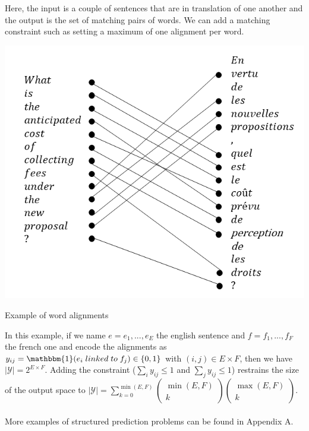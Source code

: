 \begin{example}
Here, the input is a couple of sentences that are in translation of one another
and the output is the set of matching pairs of words. We can add a matching
constraint such as setting a maximum of one alignment per word. 
\begin{center}
\includegraphics[scale=0.6]{img/lecture_1_word_alignment.png}

Example of word alignments
\end{center}
In this example, if we name $e = e_1, ..., e_E$ the english sentence and $f =
f_1, ..., f_F$ the french one and encode the alignments as $y_{ij} =
\mathbbm{1}(e_i \; linked \; to \; f_j) \in \{0,1\}$ with $(i,j) \in E \times
F$, then we have $|\mathcal{Y}| = 2^{E\times F}$. Adding the constraint
($\sum_i y_{ij} \leq 1$ and $\sum_j y_{ij} \leq 1$) restrains the size of the
output space to $|\mathcal{Y}| = \sum_{k=0}^{\min(E,F)} \begin{pmatrix}
\min(E,F) \\ k \end{pmatrix} \begin{pmatrix} \max(E,F) \\ k \end{pmatrix}$.
\\
\\
More examples of structured prediction problems can be found in Appendix A.
\end{example}

